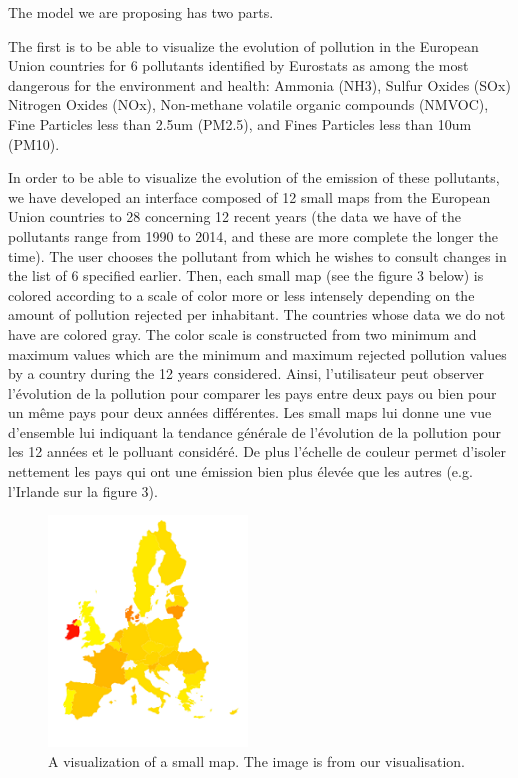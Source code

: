 \documentclass[preprint,journal]{vgtc}       %
\begin{document}
The model we are proposing has two parts.

The first is to be able to visualize the evolution of pollution in the European Union countries for 6 pollutants identified by Eurostats as among the most dangerous for the environment and health: Ammonia (NH3), Sulfur Oxides (SOx) Nitrogen Oxides (NOx), Non-methane volatile organic compounds (NMVOC), Fine Particles less than 2.5um (PM2.5), and Fines Particles less than 10um (PM10).

In order to be able to visualize the evolution of the emission of these pollutants, we have developed an interface composed of 12 small maps from the European Union countries to 28 concerning 12 recent years (the data we have of the pollutants range from 1990 to 2014, and these are more complete the longer the time). The user chooses the pollutant from which he wishes to consult changes in the list of 6 specified earlier. Then, each small map (see the figure 3 below) is colored according to a scale of color more or less intensely depending on the amount of pollution rejected per inhabitant. The countries whose data we do not have are colored gray. The color scale is constructed from two minimum and maximum values ​​which are the minimum and maximum rejected pollution values ​​by a country during the 12 years considered.
\newline
Ainsi, l'utilisateur peut observer l'évolution de la pollution pour comparer les pays entre deux pays ou bien pour un même pays pour deux années différentes. Les small maps lui donne une vue d'ensemble lui indiquant la tendance générale de l'évolution de la pollution pour les 12 années et le polluant considéré. De plus l'échelle de couleur permet d'isoler nettement les pays qui ont une émission bien plus élevée que les autres (e.g. l'Irlande sur la figure 3). 
 

\begin{figure}[tb]
 \centering %
 \includegraphics[width=200px]{smallmap}
 \caption{A visualization of a small map. The image is from our visualisation.}
 \label{fig:smallmapammoniac}
\end{figure}
\end{document}
